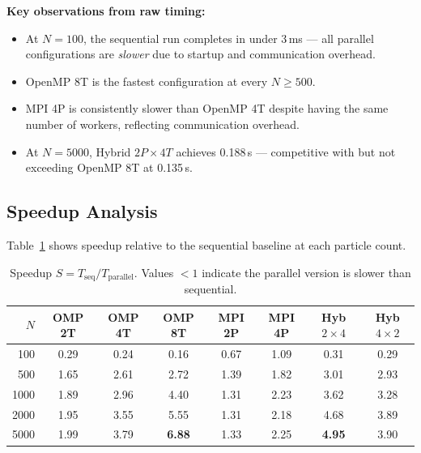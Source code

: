 ﻿\documentclass[12pt,a4paper]{article}
\begin{document}
\noindent\textbf{Key observations from raw timing:}
\begin{itemize}
    \item At $N=100$, the sequential run completes in under 3\,ms ---
          all parallel configurations are \emph{slower} due to startup
          and communication overhead.
    \item OpenMP 8T is the fastest configuration at every $N \geq 500$.
    \item MPI 4P is consistently slower than OpenMP 4T despite having the
          same number of workers, reflecting communication overhead.
    \item At $N=5000$, Hybrid $2P \times 4T$ achieves 0.188\,s ---
          competitive with but not exceeding OpenMP 8T at 0.135\,s.
\end{itemize}

\subsection{Speedup Analysis}

Table~\ref{tab:speedup} shows speedup relative to the sequential baseline
at each particle count.

\begin{table}[H]
\centering
\caption{Speedup $S = T_{\text{seq}} / T_{\text{parallel}}$.
         Values $<1$ indicate the parallel version is slower than sequential.}
\label{tab:speedup}
\begin{tabular}{rccccccc}
    \toprule
    $N$ & OMP 2T & OMP 4T & OMP 8T & MPI 2P & MPI 4P
        & Hyb $2{\times}4$ & Hyb $4{\times}2$ \\
    \midrule
    100  & 0.29 & 0.24 & 0.16 & 0.67 & 1.09 & 0.31 & 0.29 \\
    500  & 1.65 & 2.61 & 2.72 & 1.39 & 1.82 & 3.01 & 2.93 \\
    1000 & 1.89 & 2.96 & 4.40 & 1.31 & 2.23 & 3.62 & 3.28 \\
    2000 & 1.95 & 3.55 & 5.55 & 1.31 & 2.18 & 4.68 & 3.89 \\
    5000 & 1.99 & 3.79 & \textbf{6.88} & 1.33 & 2.25
         & \textbf{4.95} & 3.90 \\
    \bottomrule
\end{tabular}
\end{table}
\end{document}
